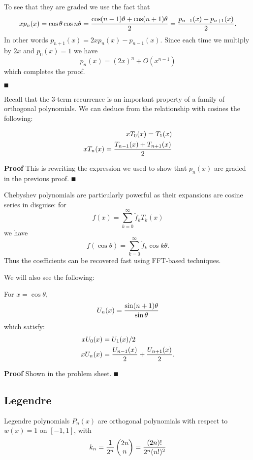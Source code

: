 To see that they are graded we use the fact that
\[
x p_n(x) = \cos \ensuremath{\theta} \cos n \ensuremath{\theta} = {\cos(n-1)\ensuremath{\theta} + \cos(n+1)\ensuremath{\theta} \over 2} = {p_{n-1}(x) + p_{n+1}(x) \over 2}.
\]
In other words $p_{n+1}(x) = 2x p_n(x) - p_{n-1}(x)$. Since each time we multiply by $2x$ and $p_0(x) = 1$ we have
\[
p_n(x) = (2x)^n + O(x^{n-1})
\]
which completes the proof.

\ensuremath{\QED}

Recall that the 3-term recurrence is an important property of a family of orthogonal polynomials. We can deduce from the relationship with cosines the following:

\begin{corollary}
\begin{align*}
x T_0(x) = T_1(x) \\
x T_n(x) = {T_{n-1}(x) + T_{n+1}(x) \over 2}
\end{align*}
\end{corollary}
\textbf{Proof} This is rewriting the expression we used to show that $p_n(x)$ are graded in the previous proof. \ensuremath{\QED}

Chebyshev polynomials are particularly powerful as their expansions are cosine series in disguise: for
\[
f(x) = \ensuremath{\sum}_{k=0}^\ensuremath{\infty} \check f_k T_k(x)
\]
we have
\[
f(\cos \ensuremath{\theta}) = \ensuremath{\sum}_{k=0}^\ensuremath{\infty} \check f_k \cos k \ensuremath{\theta}.
\]
Thus the coefficients can be recovered fast using FFT-based techniques.

We will also see the following:

\begin{theorem} For $x = \cos \ensuremath{\theta}$,
\[
U_n(x) = {\sin(n+1) \ensuremath{\theta} \over \sin \ensuremath{\theta}}
\]
which satisfy:
\begin{align*}
x U_0(x) &= U_1(x)/2 \\
x U_n(x) &= {U_{n-1}(x) \over 2} + {U_{n+1}(x) \over 2}.
\end{align*}
\end{theorem}
\textbf{Proof} Shown in the problem sheet. \ensuremath{\QED}

\subsection{Legendre}
\begin{definition}[Legendre] Legendre polynomials $P_n(x)$ are orthogonal polynomials with respect to $w(x) = 1$ on $[-1,1]$, with
\[
k_n = {1 \over 2^n} \begin{pmatrix} 2n \\ n \end{pmatrix} =
{(2n)! \over 2^n (n!)^2}
\]
\end{definition}

